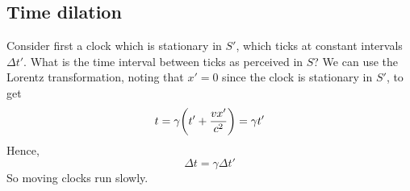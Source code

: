 \subsection{Time dilation}
Consider first a clock which is stationary in \(S'\), which ticks at constant intervals \(\Delta t'\).
What is the time interval between ticks as perceived in \(S\)?
We can use the Lorentz transformation, noting that \(x'=0\) since the clock is stationary in \(S'\), to get
\[
	t = \gamma\qty(t' + \frac{vx'}{c^2}) = \gamma t'
\]
Hence,
\[
	\Delta t = \gamma \Delta t'
\]
So moving clocks run slowly.
